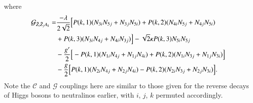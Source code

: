 \documentclass[final,3p,times,pdflatex]{elsarticle}
\begin{document}
where
\begin{equation}
\begin{aligned}
\mathcal{G}_{\tilde{Z}_i \tilde{Z}_j A_k} = & {-\lambda \over 2 \sqrt{2}}\Big[P(k,1)(N_{3i}N_{5j} + N_{3j}N_{5i}) + P(k,2)(N_{4i}N_{5j} + N_{4j}N_{5i}) \\ &  + P(k,3)(N_{3i}N_{4j} + N_{4i}N_{3j})\Big] - \sqrt{2} \kappa P(k,3) N_{5i}N_{5j} \\ &  - {g' \over 2}\Big[-P(k,1)(N_{1i}N_{4j} + N_{1j}N_{4i}) + P(k,2)(N_{1i}N_{3j} + N_{1j}N_{3i})\Big] \\ &  - {g \over 2}\Big[P(k,1)(N_{2i}N_{4j} + N_{2j}N_{4i}) - P(k,2)(N_{2i}N_{3j} + N_{2j}N_{3i})\Big].
\end{aligned}
\end{equation}
Note the $\mathcal{C}$ and $\mathcal{G}$ couplings here are similar to those
given for the reverse decays of Higgs bosons to neutralinos earlier, with
$i$, $j$, $k$ permuted accordingly. 
\end{document}

